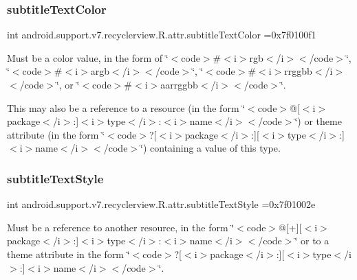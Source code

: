 \subsubsection{\texorpdfstring{subtitle\+Text\+Color}{subtitleTextColor}}
{\footnotesize\ttfamily int android.\+support.\+v7.\+recyclerview.\+R.\+attr.\+subtitle\+Text\+Color =0x7f0100f1\hspace{0.3cm}{\ttfamily [static]}}

Must be a color value, in the form of \char`\"{}$<$code$>$\#$<$i$>$rgb$<$/i$>$$<$/code$>$\char`\"{}, \char`\"{}$<$code$>$\#$<$i$>$argb$<$/i$>$$<$/code$>$\char`\"{}, \char`\"{}$<$code$>$\#$<$i$>$rrggbb$<$/i$>$$<$/code$>$\char`\"{}, or \char`\"{}$<$code$>$\#$<$i$>$aarrggbb$<$/i$>$$<$/code$>$\char`\"{}. 

This may also be a reference to a resource (in the form \char`\"{}$<$code$>$@\mbox{[}$<$i$>$package$<$/i$>$\+:\mbox{]}$<$i$>$type$<$/i$>$\+:$<$i$>$name$<$/i$>$$<$/code$>$\char`\"{}) or theme attribute (in the form \char`\"{}$<$code$>$?\mbox{[}$<$i$>$package$<$/i$>$\+:\mbox{]}\mbox{[}$<$i$>$type$<$/i$>$\+:\mbox{]}$<$i$>$name$<$/i$>$$<$/code$>$\char`\"{}) containing a value of this type. \mbox{\label{classandroid_1_1support_1_1v7_1_1recyclerview_1_1R_1_1attr_a67afe6c327ea30e504856a5e70fff4bb}} 
\subsubsection{\texorpdfstring{subtitle\+Text\+Style}{subtitleTextStyle}}
{\footnotesize\ttfamily int android.\+support.\+v7.\+recyclerview.\+R.\+attr.\+subtitle\+Text\+Style =0x7f01002e\hspace{0.3cm}{\ttfamily [static]}}

Must be a reference to another resource, in the form \char`\"{}$<$code$>$@\mbox{[}+\mbox{]}\mbox{[}$<$i$>$package$<$/i$>$\+:\mbox{]}$<$i$>$type$<$/i$>$\+:$<$i$>$name$<$/i$>$$<$/code$>$\char`\"{} or to a theme attribute in the form \char`\"{}$<$code$>$?\mbox{[}$<$i$>$package$<$/i$>$\+:\mbox{]}\mbox{[}$<$i$>$type$<$/i$>$\+:\mbox{]}$<$i$>$name$<$/i$>$$<$/code$>$\char`\"{}. \mbox{\label{classandroid_1_1support_1_1v7_1_1recyclerview_1_1R_1_1attr_a16aaf0d7f8d3c6dd3f4dd397baaaea71}} 
